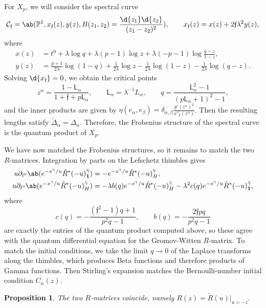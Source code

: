 \documentclass{amsart}
\newtheorem{prop}[thm]{Proposition}
\theoremstyle{definition}
\theoremstyle{remark}
\theoremstyle{plain}
\theoremstyle{definition}
\theoremstyle{remark}
\renewcommand{\P}{\mathbb{P}}
\newcommand{\mc}[1]{\mathcal{#1}}
\newcommand{\mf}[1]{\mathfrak{#1}}
\newcommand{\ms}[1]{\mathsf{#1}}
\newcommand{\1}{\mathbf{1}}
\newcommand{\2}{\mathbf{2}}
\newcommand{\3}{\mathbf{3}}
\begin{document}
For \(X_p\), we will consider the spectral curve
\[ \mc{C}_{\mf{f}} = \ab(\P^1, x_{\mf{f}}(z), y(z), B(z_1,z_2) = \frac{\d{z_1}\d{z_2}}{(z_1-z_2)^2}), \qquad x_{\mf{f}}(z) = x(z) + 2\mf{f}\lambda^2 y(z), \]
where
\begin{align*}
    x(z) &= t^0 + \lambda \log q + \lambda(p-1)\log z + \lambda(-p-1)\log\frac{q-z}{1-z}, \\
    y(z) &= \frac{p+1}{2\lambda}\log(1-q) + \frac{1}{2\lambda}\log z - \frac{1}{2\lambda}\log(1-z) - \frac{1}{2\lambda}\log(q-z).
\end{align*}
Solving \(\d{x_{\mf{f}}} = 0\), we obtain the critical points
\[ z^{\alpha} = \frac{1-\ms{L}_{\alpha}}{1+\mf{f}+p\ms{L}_{\alpha}}, \qquad \ms{L}_{\alpha} = \lambda^{-1}L_{\alpha}, \qquad q = \frac{\ms{L}_{\alpha}^2-1}{(p\ms{L}_{\alpha}+1)^2-1}, \]
and the inner products are given by \(\eta(e_{\alpha},e_{\beta}) = \delta_{\alpha,\beta}\frac{y'(z^{\alpha})^2}{x''_{\mf{f}}(z^{\alpha})}\). Then the resulting lengths satisfy \(\check{\Delta}_{\alpha} = \Delta_{\alpha}\). Therefore, the Frobenius structure of the spectral curve is the quantum product of \(X_p\).

We have now matched the Frobenius structures, so it remains to match the two \(R\)-matrices. Integration by parts on the Lefschetz thimbles gives
\begin{align*}
    u \partial_{t^0}\ab(e^{-x^{\gamma}/u}\check{R}^*(-u)^{\bar{\gamma}}_{\1}) &= -e^{-x^{\gamma}/u}\check{R}^*(-u)^{\bar{\gamma}}_H, \\
    u\partial_{t^0}\ab(e^{-x^{\gamma}/u}\check{R}^*(-u)^{\bar{\gamma}}_H) &= -\lambda b(q)e^{-x^{\gamma}/u}\check{R}^*(-u)^{\bar{\gamma}}_H - \lambda^2 c(q) e^{-x^{\gamma}/u}\check{R}^*(-u)^{\bar{\gamma}}_{\1},
\end{align*}
where
\[ c(q) = -\frac{(\mf{f}^2-1)q+1}{p^2q-1}, \qquad b(q) = -\frac{2\mf{f}pq}{p^2q-1} \]
are exactly the entries of the quantum product computed above, so these agree with the quantum differential equation for the Gromov-Witten \(R\)-matrix. To match the initial conditions, we take the limit \(q \to 0\) of the Laplace transforms along the thimbles, which produces Beta functions and therefore products of Gamma functions. Then Stirling's expansion matches the Bernoulli-number initial condition \(C_{\alpha}(z)\).

\begin{prop}%
\label{prop:R matrices coincide}
    The two \(R\)-matrices coincide, namely \(R(z) = \check{R}(u)|_{u=-z}\).
\end{prop}
\end{document}
